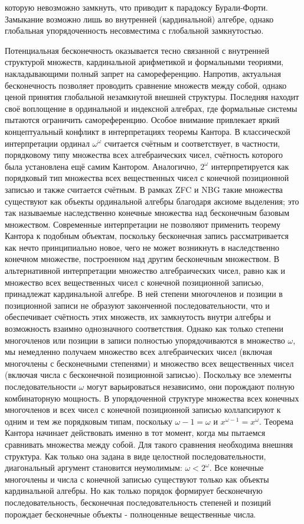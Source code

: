 \documentclass[12pt]{article}
\begin{document}
которую невозможно замкнуть, что приводит к парадоксу Бурали-Форти. Замыкание возможно лишь во внутренней (кардинальной) алгебре, однако глобальная упорядоченность несовместима с глобальной замкнутостью.

Потенциальная бесконечность оказывается тесно связанной с внутренней структурой множеств, кардинальной арифметикой и формальными теориями, накладывающими полный запрет на самореференцию. Напротив, актуальная бесконечность позволяет проводить сравнение множеств между собой, однако ценой принятия глобальной незамкнутой внешней структуры. Последняя находит своё воплощение в ординальной и индексной алгебрах, где формальные системы пытаются ограничить самореференцию. Особое внимание привлекает яркий концептуальный конфликт в интерпретациях теоремы Кантора. В классической интерпретации ординал $\omega^\omega$ считается счётным и соответствует, в частности, порядковому типу множества всех алгебраических чисел, счётность которого была установлена ещё самим Кантором. Аналогично, $2^\omega$ интерпретируется как порядковый тип множества всех вещественных чисел с конечной позиционной записью и также считается счётным. В рамках ZFC и NBG такие множества существуют как объекты ординальной алгебры благодаря аксиоме выделения; это так называемые наследственно конечные множества над бесконечным базовым множеством. Современные интерпретации не позволяют применить теорему Кантора к подобным объектам, поскольку бесконечная запись рассматривается как нечто принципиально новое, чего не может возникнуть в наследственно конечном множестве, построенном над другим бесконечным множеством. В альтернативной интерпретации множество алгебраических чисел, равно как и множество всех вещественных чисел с конечной позиционной записью, принадлежат кардинальной алгебре. В ней степени многочленов и позиции в позиционной записи не образуют законченной последовательности, что и обеспечивает счётность этих множеств, их замкнутость внутри алгебры и возможность взаимно однозначного соответствия. Однако как только степени многочленов или позиции в записи полностью упорядочиваются в множество $\omega$, мы немедленно получаем множество всех алгебраических чисел (включая многочлены с бесконечными степенями) и множество всех вещественных чисел (включая числа с бесконечной позиционной записью). Поскольку все элементы последовательности $\omega$ могут варьироваться независимо, они порождают полную комбинаторную мощность. В упорядоченной структуре множества всех конечных многочленов и всех чисел с конечной позиционной записью коллапсируют к одним и тем же порядковым типам, поскольку $\omega - 1 = \omega$ и $x^{\omega - 1} = x^\omega$. Теорема Кантора начинает действовать именно в тот момент, когда мы пытаемся сравнивать множества между собой. Для такого сравнения необходима внешняя структура. Как только она задана в виде целостной последовательности, диагональный аргумент становится неумолимым: $\omega < 2^\omega$. Все конечные многочлены и числа с конечной записью существуют только как объекты кардинальной алгебры. Но как только порядок формирует бесконечную последовательность, бесконечная последовательность степеней и позиций порождает бесконечные объекты - полноценные вещественные числа.
\end{document}
